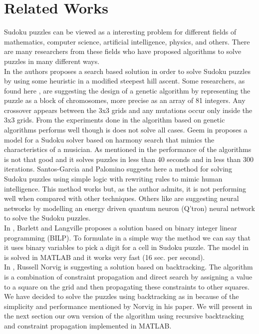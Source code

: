 \documentclass[12pt,a4paper]{article} %
\begin{document}
\section{Related Works}
Sudoku puzzles can be viewed as a interesting problem for different fields of mathematics, computer science, artificial intelligence, physics, and others. There are many researchers from these fields who have proposed algorithms to solve puzzles in many different ways. 
\newline
\\ In \cite{jones2008construction} the authors proposes a search based solution in order to solve Sudoku puzzles by using some heuristic in a modified steepest hill ascent. Some researchers, as found here \cite{mantere2007solving}, are suggesting the design of a genetic algorithm by representing the puzzle as a block of chromosomes, more precise as an array of 81 integers. Any crossover appears between the 3x3 grids and any mutations occur only inside the 3x3 grids. From the experiments done in \cite{mantere2007solving} the algorithm based on genetic algorithms performs well though is does not solve all cases. Geem in \cite{geem2008harmony} proposes a model for a Sudoku solver based on harmony search that mimics the characteristics of a musician. As mentioned in \cite{green2009survey} the performance of the algorithms is not that good and it solves puzzles in less than 40 seconds and in less than 300 iterations. Santos-Garcia and Palomino suggests here \cite{santos2007solving} a method for solving Sudoku puzzles using simple logic with rewriting rules to mimic human intelligence. This method works but, as the author admits, it is not performing well when compared with other techniques. Others like \cite{yue2006sudoku} are suggesting neural networks by modelling an energy driven quantum neuron (Q'tron) neural network to solve the Sudoku puzzles. 
\newline
\\ In \cite{bartlett2006integer}, Barlett and Langville proposes a solution based on binary integer linear programming (BILP). To formulate in a simple way the method we can say that it uses binary variables to pick a digit for a cell in Sudoku puzzle. The model in \cite{bartlett2006integer} is solved in MATLAB and it works very fast (16 sec. per second).
\newline
\\ In \cite{norvigsolving}, Russell Norvig is suggesting a solution based on backtracking. The algorithm is a combination of constraint propagation and direct search by assigning a value to a square on the grid and then propagating these constraints to other squares.
\newline
\\ We have decided to solve the puzzles using backtracking as in \cite{norvigsolving} because of the simplicity and performance mentioned by Norvig in his paper. We will present in the next section our own version of the algorithm using recursive backtracking and constraint propagation implemented in MATLAB.
\end{document}
